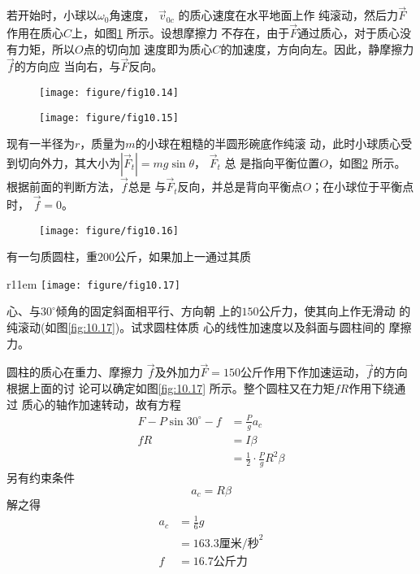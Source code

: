 \documentclass[../outline-of-mechanics.tex]{subfiles}
\begin{document}
若开始时，小球以$ \omega_{ 0 } $角速度， $ \vec{v} _ { 0c } $ 的质心速度在水平地面上作
纯滚动，然后力$\vec{F}$作用在质心$ C $上，如图\ref{fig:10.15} 所示。设想摩擦力
不存在，由于$\vec{ F }$通过质心，对于质心没有力矩，所以$ O $点的切向加
速度即为质心$ C $的加速度，方向向左。因此，静摩擦力$\vec{f}$的方向应
当向右，与$\vec{F}$反向。

\begin{figure}[h]
  \begin{minipage}{0.5\linewidth}
    \centering
    \texttt{[image: figure/fig10.14]}
    \caption{}
    \label{fig:10.14}
  \end{minipage}
  \begin{minipage}{0.5\linewidth}
    \centering
    \texttt{[image: figure/fig10.15]}
    \caption{}
    \label{fig:10.15}
  \end{minipage}
\end{figure}

现有一半径为$ r $，质量为$ m $的小球在粗糙的半圆形碗底作纯滚
动，此时小球质心受到切向外力，其大小为$ | \vec{F} _ t | = m g \sin \theta $， $ \vec{F} _ t $ 总
是指向平衡位置$ O $，如图\ref{fig:10.16} 所示。根据前面的判断方法，$\vec{f}$总是
与$ \vec{F} _ t $反向，并总是背向平衡点$ O $；在小球位于平衡点时， $ \vec{f} = 0 $。

\begin{figure}[h]
  \centering
  \texttt{[image: figure/fig10.16]}
  \caption{}
  \label{fig:10.16}
\end{figure}

\clearpage
\example 有一匀质圆柱，重$ 200 $公斤，如果加上一通过其质
\begin{wrapfigure}[6]{r}{11em}
  \centering
  \texttt{[image: figure/fig10.17]}
  \caption{}
  \label{fig:10.17}
\end{wrapfigure}
心、与$ 30^\circ $倾角的固定斜面相平行、方向朝
上的$ 150 $公斤力，使其向上作无滑动
的纯滚动(如图\ref{fig:10.17})。试求圆柱体质
心的线性加速度以及斜面与圆柱间的
摩擦力。

\solution 圆柱的质心在重力、摩擦力
$\vec{f}$及外加力$ \vec{F}=150 $公斤作用下作加速运动，$\vec{f}$的方向根据上面的讨
论可以确定如图\ref{fig:10.17} 所示。整个圆柱又在力矩$ fR $作用下绕通过
质心的轴作加速转动，故有方程
\begin{equation*}
  \begin{split}
    F - P \sin 3 0 ^ { \circ } - f &= \frac { P } { g } a _ { c } \\
    f R &= I \beta \\
    &= \frac { 1 } { 2 } \cdot \frac { P } { g } R ^ { 2 } \beta
  \end{split}
\end{equation*}
另有约束条件
\begin{equation*}
  a _ { c } = R \beta
\end{equation*}
解之得
\begin{equation*}
  \begin{split}
    a _ { c } &= \frac { 1 } { 6 } g \\
    &= 1 6 3 . 3 \text{厘米/秒} ^ 2 \\
    f &= 1 6 . 7 \text{公斤力}
  \end{split}
\end{equation*}
\end{document}
